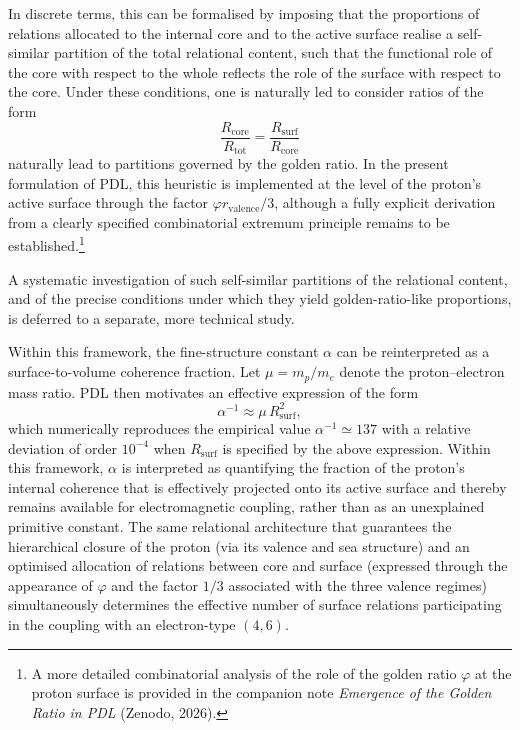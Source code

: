 \documentclass[11pt,a4paper]{article}
\begin{document}
In discrete terms, this can be formalised by imposing that the proportions of relations allocated to the internal core and to the active surface realise a self-similar partition of the total relational content, such that the functional role of the core with respect to the whole reflects the role of the surface with respect to the core. Under these conditions, one is naturally led to consider ratios of the form
\[
\frac{R_{\text{core}}}{R_{\text{tot}}} = \frac{R_{\text{surf}}}{R_{\text{core}}}
\]
naturally lead to partitions governed by the golden ratio. In the present formulation of PDL, this heuristic is implemented at the level of the proton’s active surface through the factor $\varphi r_{\text{valence}}/3$, although a fully explicit derivation from a clearly specified combinatorial extremum principle remains to be established.\footnote{A more detailed combinatorial analysis of the role of the golden ratio $\varphi$ at the proton surface is provided in the companion note \emph{Emergence of the Golden Ratio in PDL} (Zenodo, 2026).}


A systematic investigation of such self-similar partitions of the relational content, and of the precise conditions under which they yield golden-ratio-like proportions, is deferred to a separate, more technical study.

Within this framework, the fine-structure constant $\alpha$ can be reinterpreted as a surface-to-volume coherence fraction. Let $\mu = m_p/m_e$ denote the proton–electron mass ratio. PDL then motivates an effective expression of the form
\[
\alpha^{-1} \approx \mu \, R_{\text{surf}}^2,
\]
which numerically reproduces the empirical value $\alpha^{-1} \simeq 137$ with a relative deviation of order $10^{-4}$ when $R_{\text{surf}}$ is specified by the above expression. Within this framework, $\alpha$ is interpreted as quantifying the fraction of the proton’s internal coherence that is effectively projected onto its active surface and thereby remains available for electromagnetic coupling, rather than as an unexplained primitive constant. The same relational architecture that guarantees the hierarchical closure of the proton (via its valence and sea structure) and an optimised allocation of relations between core and surface (expressed through the appearance of $\varphi$ and the factor $1/3$ associated with the three valence regimes) simultaneously determines the effective number of surface relations participating in the coupling with an electron-type $(4,6)$.
\end{document}
